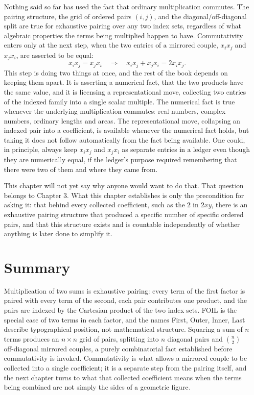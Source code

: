 \documentclass[11pt]{book}
\begin{document}
Nothing said so far has used the fact that ordinary multiplication commutes. The pairing structure, the grid of ordered pairs $(i,j)$, and the diagonal/off-diagonal split are true for exhaustive pairing over any two index sets, regardless of what algebraic properties the terms being multiplied happen to have. Commutativity enters only at the next step, when the two entries of a mirrored couple, $x_ix_j$ and $x_jx_i$, are asserted to be equal:
\[
x_ix_j = x_jx_i \quad\Longrightarrow\quad x_ix_j+x_jx_i = 2x_ix_j.
\]
This step is doing two things at once, and the rest of the book depends on keeping them apart. It is asserting a numerical fact, that the two products have the same value, and it is licensing a representational move, collecting two entries of the indexed family into a single scalar multiple. The numerical fact is true whenever the underlying multiplication commutes: real numbers, complex numbers, ordinary lengths and areas. The representational move, collapsing an indexed pair into a coefficient, is available whenever the numerical fact holds, but taking it does not follow automatically from the fact being available. One could, in principle, always keep $x_ix_j$ and $x_jx_i$ as separate entries in a ledger even though they are numerically equal, if the ledger's purpose required remembering that there were two of them and where they came from.

This chapter will not yet say why anyone would want to do that. That question belongs to Chapter 3. What this chapter establishes is only the precondition for asking it: that behind every collected coefficient, such as the $2$ in $2xy$, there is an exhaustive pairing structure that produced a specific number of specific ordered pairs, and that this structure exists and is countable independently of whether anything is later done to simplify it.

\section{Summary}

Multiplication of two sums is exhaustive pairing: every term of the first factor is paired with every term of the second, each pair contributes one product, and the pairs are indexed by the Cartesian product of the two index sets. FOIL is the special case of two terms in each factor, and the names First, Outer, Inner, Last describe typographical position, not mathematical structure. Squaring a sum of $n$ terms produces an $n\times n$ grid of pairs, splitting into $n$ diagonal pairs and $\binom{n}{2}$ off-diagonal mirrored couples, a purely combinatorial fact established before commutativity is invoked. Commutativity is what allows a mirrored couple to be collected into a single coefficient; it is a separate step from the pairing itself, and the next chapter turns to what that collected coefficient means when the terms being combined are not simply the sides of a geometric figure.
\end{document}
